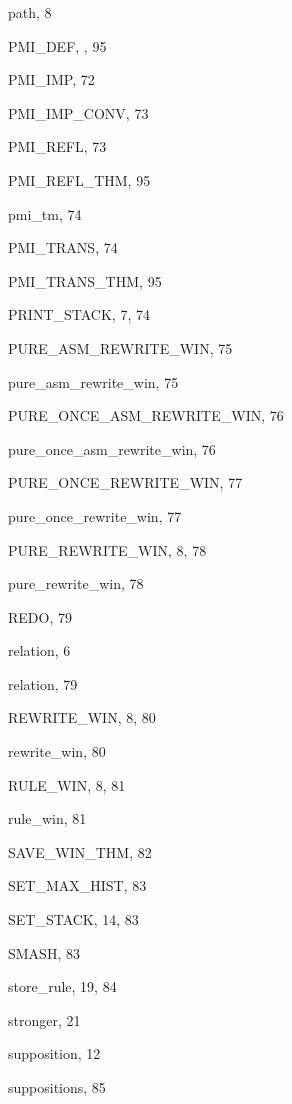 \begin{theindex}
  \item {\ptt path}, 8
  \item {\ptt PMI\_DEF}, , 95
  \item {\ptt PMI\_IMP}, 72
  \item {\ptt PMI\_IMP\_CONV}, 73
  \item {\ptt PMI\_REFL}, 73
  \item {\ptt PMI\_REFL\_THM}, 95
  \item {\ptt pmi\_tm}, 74
  \item {\ptt PMI\_TRANS}, 74
  \item {\ptt PMI\_TRANS\_THM}, 95
  \item {\ptt PRINT\_STACK}, 7, 74
  \item {\ptt PURE\_ASM\_REWRITE\_WIN}, 75
  \item {\ptt pure\_asm\_rewrite\_win}, 75
  \item {\ptt PURE\_ONCE\_ASM\_REWRITE\_WIN}, 76
  \item {\ptt pure\_once\_asm\_rewrite\_win}, 76
  \item {\ptt PURE\_ONCE\_REWRITE\_WIN}, 77
  \item {\ptt pure\_once\_rewrite\_win}, 77
  \item {\ptt PURE\_REWRITE\_WIN}, 8, 78
  \item {\ptt pure\_rewrite\_win}, 78

  \indexspace

  \item {\ptt REDO}, 79
  \item relation, 6
  \item {\ptt relation}, 79
  \item {\ptt REWRITE\_WIN}, 8, 80
  \item {\ptt rewrite\_win}, 80
  \item {\ptt RULE\_WIN}, 8, 81
  \item {\ptt rule\_win}, 81

  \indexspace

  \item {\ptt SAVE\_WIN\_THM}, 82
  \item {\ptt SET\_MAX\_HIST}, 83
  \item {\ptt SET\_STACK}, 14, 83
  \item {\ptt SMASH}, 83
  \item {\ptt store\_rule}, 19, 84
  \item stronger, 21
  \item supposition, 12
  \item {\ptt suppositions}, 85


\end{theindex}

